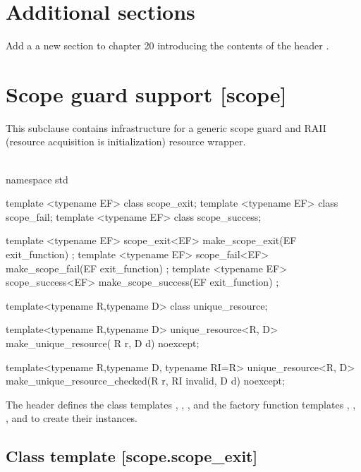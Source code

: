 \documentclass[ebook,11pt,article]{memoir}
\begin{document}
\section{Additional sections}
Add a a new section to chapter 20 introducing the contents of the header .

\section{Scope guard support [scope]}
This subclause contains infrastructure for a generic scope guard and RAII (resource acquisition is initialization) resource wrapper.\\
\\


\begin{codeblock}
namespace std {
template <typename EF>
class scope_exit;
template <typename EF>
class scope_fail;
template <typename EF>
class scope_success;

template <typename EF>
scope_exit<EF> make_scope_exit(EF exit_function) ;
template <typename EF>
scope_fail<EF> make_scope_fail(EF exit_function) ;
template <typename EF>
scope_success<EF> make_scope_success(EF exit_function) ;

template<typename R,typename D>
class unique_resource;

template<typename R,typename D>
unique_resource<R, D>
make_unique_resource( R  r, D d) noexcept;

template<typename R,typename D, typename RI=R>
unique_resource<R, D>
make_unique_resource_checked(R r, RI invalid, D d) noexcept;

}
\end{codeblock}

\pnum
The header   defines the class templates , , ,  
and the factory function templates , ,
,
 and   to create their instances.

\subsection {Class template  [scope.scope_exit]}
\end{document}
